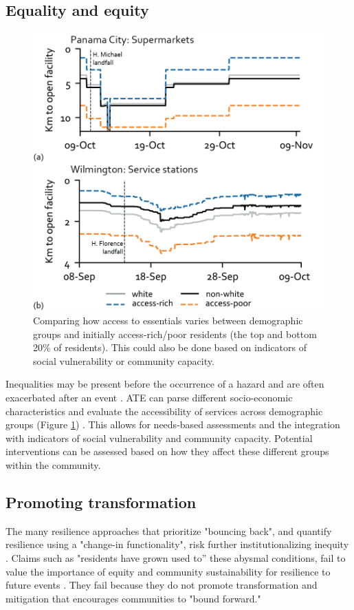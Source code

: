 \documentclass[9pt,twocolumn,twoside,lineno]{pnas-new}
\begin{document}
\subsection*{Equality and equity}
\begin{figure}
    \centering
    \includegraphics[width=0.8\linewidth]{report/fig/equality.png}
    \caption{Comparing how access to essentials varies between demographic groups and initially access-rich/poor residents (the top and bottom 20\% of residents). This could also be done based on indicators of social vulnerability or community capacity.}
    \label{fig:equality}
\end{figure}
Inequalities may be present before the occurrence of a hazard and are often exacerbated after an event \cite{Gardoni2018-xu}.
ATE can parse different socio-economic characteristics and evaluate the accessibility of services across demographic groups (Figure \ref{fig:equality}) \cite{Williams_undated-sy}.
This allows for needs-based assessments and the integration with indicators of social vulnerability and community capacity.
Potential interventions can be assessed based on how they affect these different groups within the community.

\subsection*{Promoting transformation}
The many resilience approaches that prioritize "bouncing back", and quantify resilience using a "change-in functionality", risk further institutionalizing inequity \cite{Normandin2019-hp, I_Sudmeier-Rieux2014-lc, MacKinnon2013-nx}.
Claims such as "residents have grown used to” these abysmal conditions, fail to value the importance of equity and community sustainability for resilience to future events \cite{Dempsey2011-og, Pantelic1991-qu}.
They fail because they do not promote transformation and mitigation that encourages communities to "bound forward."
\end{document}
